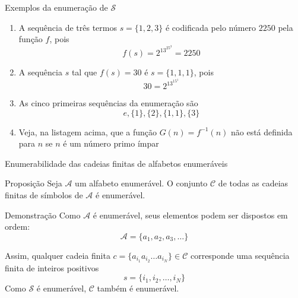 \begin{frame}[fragile]{Exemplos da enumeração de $\mathcal{S}$}

    \begin{enumerate}
        \item A sequência de três termos $s = \lbrace 1, 2, 3\rbrace$ é codificada pelo número
        $2250$ pela função $f$, pois
        \[
            f(s) = 2^13^25^3 = 2250
        \]

        \item A sequência $s$ tal que $f(s) = 30$ é $s = \lbrace 1, 1, 1\rbrace$, pois
        \[
            30 = 2^13^15^1
        \]

        \item As cinco primeiras sequências da enumeração são
        \[
            e, \lbrace 1\rbrace, \lbrace 2\rbrace, \lbrace 1, 1\rbrace, \lbrace 3\rbrace
        \]

        \item Veja, na listagem acima, que a função $G(n) = f^{-1}(n)$ não está definida para
            $n$ se $n$ é um número primo ímpar
    \end{enumerate}

\end{frame}

\begin{frame}[fragile]{Enumerabilidade das cadeias finitas de alfabetos enumeráveis}

    \begin{block}{Proposição}
        Seja $\mathcal{A}$ um alfabeto enumerável. O conjunto $\mathcal{C}$ de todas as cadeias 
        finitas de símbolos de $\mathcal{A}$ é enumerável.
    \end{block}

    \begin{block}{Demonstração}
        Como $\mathcal{A}$ é enumerável, seus elementos podem ser dispostos em ordem:
        \[
            \mathcal{A} = \lbrace a_1, a_2, a_3, \ldots\rbrace
        \]

        Assim, qualquer cadeia finita $c = \lbrace a_{i_1}a_{i_2}\ldots a_{i_N}\rbrace\in\mathcal{C}$ 
        corresponde uma sequência finita de inteiros positivos
        \[
            s = \lbrace i_1, i_2, \ldots, i_N\rbrace
        \]
        Como $\mathcal{S}$ é enumerável, $\mathcal{C}$ também é enumerável.
    \end{block}


\end{frame}
